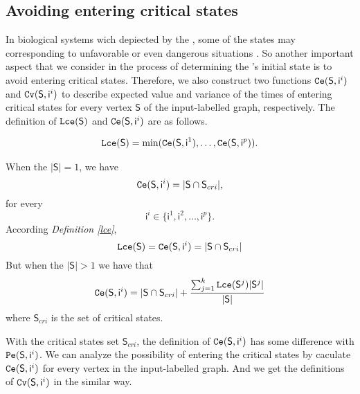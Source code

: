 \subsection{Avoiding entering critical states}
In biological systems wich depiected by the \BCNs, some of the states may corresponding to unfavorable or even dangerous situations \cite{Li2014Controllability}. So another important aspect that we consider in the process of determining the \BCN's initial state is to avoid entering critical states. Therefore, we also construct two functions ${\tt Ce}(\mathsf{S}, \mathsf{ i}^{i})$ and ${\tt Cv}(\mathsf{S}, \mathsf{ i}^{i})$ to describe expected value and variance of the times of entering critical states for every vertex $\mathsf{S}$ of the input-labelled graph, respectively. The definition of ${\tt Lce}(\mathsf{S})$ and ${\tt Ce}(\mathsf{S}, \mathsf{ i}^{i})$ are as follows.\\
\begin{definition} \label{lce}
\begin{equation}
\begin{split}
{\tt Lce}(\mathsf{S})= \min({\tt Ce}(\mathsf{S}, \mathsf{ i}^{1}),\ldots,{\tt Ce}(\mathsf{S}, \mathsf{ i}^{p})).
\end{split}
\end{equation}
\end{definition}
\begin{definition} 
When the $|\mathsf{S}|=1$, we have \[{\tt Ce}(\mathsf{S}, \mathsf{ i}^{i})=|\mathsf{S} \cap \mathsf{S}_{cri} |,\]  for every \[\mathsf{ i}^{i} \in \{\mathsf{ i}^{1},\mathsf{ i}^{2},\ldots, \mathsf{ i}^{p}\}.\]  
According {\em Definition \ref{lce}}, 
\[{\tt Lce}(\mathsf{S})={\tt Ce}(\mathsf{S}, \mathsf{ i}^{i})=|\mathsf{S} \cap \mathsf{S}_{cri} |\] 
But when the $|\mathsf{S}|>1$ 
we have that 
\begin{equation}
\begin{split}
{\tt Ce}(\mathsf{S}, \mathsf{ i}^{i})=|\mathsf{S} \cap \mathsf{S}_{cri}| +\frac{\sum_{j=1}^k {\tt Lce}(\mathsf{S}^{j})|\mathsf{S}^{j}|}{ |\mathsf{S}|} 
\end{split}
\end{equation}
where $\mathsf{S}_{cri}$ is the set of critical states.
\end{definition}

With the critical states set $\mathsf{S}_{cri}$, the definition of ${\tt Ce}(\mathsf{S}, \mathsf{ i}^{i})$ has some difference with ${\tt Pe}(\mathsf{S}, \mathsf{ i}^{i})$. We can analyze the possibility of entering the critical states by caculate ${\tt Ce}(\mathsf{S}, \mathsf{ i}^{i})$ for every vertex in the input-labelled graph. And we get the definitions of ${\tt Cv}(\mathsf{S}, \mathsf{ i}^{i})$ in the similar way.

